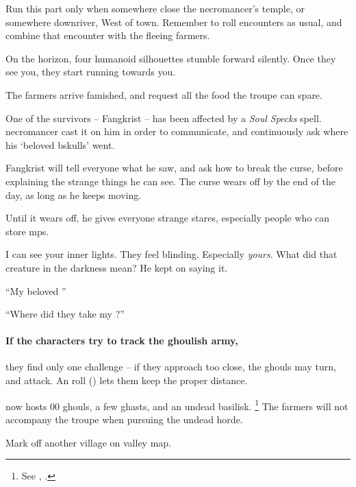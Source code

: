 Run this part only when somewhere close the \gls{necromancer}'s temple, or somewhere downriver, West of \gls{town}.
Remember to roll encounters as usual, and combine that encounter with the fleeing farmers.

\begin{boxtext}
  On the horizon, four humanoid silhouettes stumble forward silently.
  Once they see you, they start running towards you.
\end{boxtext}

The farmers arrive famished, and request all the food the troupe can spare.

One of the survivors -- Fangkrist -- has been affected by a \textit{Soul Specks} spell.
\Gls{necromancer} cast it on him in order to communicate, and continuously ask where his `beloved \gls{bskulls}' went.

Fangkrist will tell everyone what he saw, and ask how to break the curse, before explaining the strange things he can see.
The curse wears off by the end of the day, as long as he keeps moving.

Until it wears off, he gives everyone strange stares, especially people who can store \glspl{mp}.

\begin{speechtext}
  I can see your inner lights.
  They feel blinding.
  Especially \emph{yours}.%
  What did that creature in the darkness mean?
  He kept on saying it.

  ``My beloved ''

  ``Where did they take my ?''
\end{speechtext}

\paragraph{If the characters try to track the ghoulish army,}
they find only one challenge -- if they approach too close, the ghouls may turn, and attack.
An  roll (\tn[10]) lets them keep the proper distance.

 now hosts 00 ghouls, a few ghasts, and an undead basilisk.%
\footnote{See , .}
The farmers will not accompany the troupe when pursuing the undead horde.

Mark off another \gls{village} on \gls{valley} map.


